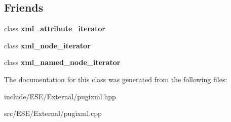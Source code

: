 \subsection*{Friends}
\begin{DoxyCompactItemize}
\item 
\hypertarget{classpugi_1_1xml__node_aeff34dec57ee910e3344631528969539}{class {\bfseries xml\-\_\-attribute\-\_\-iterator}}\label{classpugi_1_1xml__node_aeff34dec57ee910e3344631528969539}

\item 
\hypertarget{classpugi_1_1xml__node_aa25e28e29a8cec4daa60cdd2d5934757}{class {\bfseries xml\-\_\-node\-\_\-iterator}}\label{classpugi_1_1xml__node_aa25e28e29a8cec4daa60cdd2d5934757}

\item 
\hypertarget{classpugi_1_1xml__node_a1e60ab2fa6d6adb56f4b833761fc0b66}{class {\bfseries xml\-\_\-named\-\_\-node\-\_\-iterator}}\label{classpugi_1_1xml__node_a1e60ab2fa6d6adb56f4b833761fc0b66}

\end{DoxyCompactItemize}


The documentation for this class was generated from the following files\-:\begin{DoxyCompactItemize}
\item 
include/\-E\-S\-E/\-External/pugixml.\-hpp\item 
src/\-E\-S\-E/\-External/pugixml.\-cpp\end{DoxyCompactItemize}
